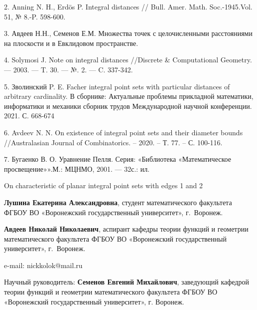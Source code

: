 \documentclass[a4paper,openbib]{article}
\begin{document}
2. Anning N. H., Erdös P. Integral distances // Bull. Amer. Math. Soc.-1945.Vol. 51, № 8.-P. 598-600.

3. Авдеев Н.Н., Семенов Е.М. Множества точек с целочисленными расстояниями на плоскости и в Евклидовом пространстве.

4. Solymosi J. Note on integral distances //Discrete \& Computational Geometry. --- 2003. --- T. 30. --- №. 2. --- C. 337-342.

5. Зволинский P. E. Facher integral point sets with particular distances of arbitrary cardinality.
В сборнике: Актуальные проблемы прикладной математики, информатики и механики сборник трудов Международной научной конференции. 2021. С. 668-674

6. Avdeev N. N. On existence of integral point sets and their diameter bounds //Australasian Journal of Combinatorics. – 2020. – Т. 77. – С. 100-116.

7. Бугаенко В. О. Уравнение Пелля. Серия: «Библиотека «Математическое просвещение»».М.: МЦНМО, 2001. --- 32с.: ил.


On characteristic of planar integral point sets with edges 1 and 2

{\bf Лушина Екатерина Александровна}, студент математического факультета ФГБОУ ВО «Воронежский государственный университет», г.~Воронеж.

{\bf Авдеев Николай Николаевич}, аспирант кафедры теории функций и геометрии математического факультета ФГБОУ ВО «Воронежский государственный университет», г.~Воронеж.

e-mail: nickkolok@mail.ru

Научный руководитель:
{\bf Семенов Евгений Михайлович},
заведующий кафедрой теории функций и геометрии математического факультета ФГБОУ ВО «Воронежский государственный
университет», г. Воронеж.
\end{document}
